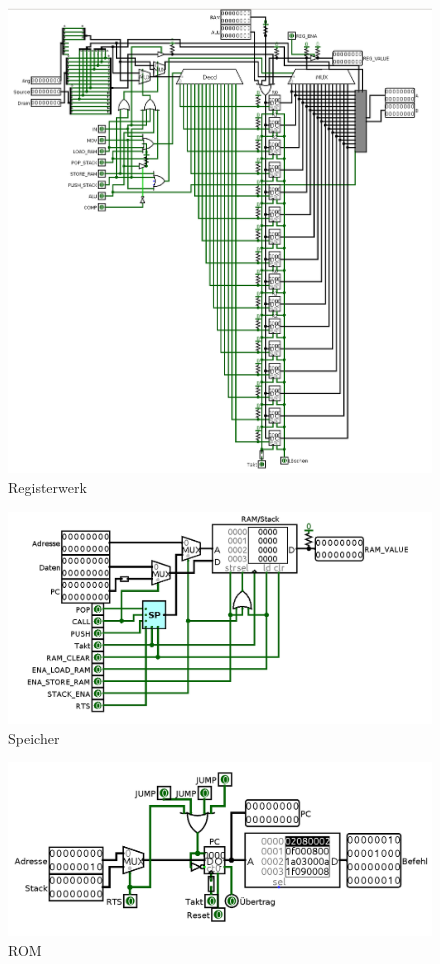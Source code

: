 \documentclass[a4paper,12pt]{article}
\begin{document}
\newpage

\begin{figure}[!htbp]
\includegraphics[scale=0.35]{register}
\centering
\caption{Registerwerk}
\label{fig:register}
\end{figure}

\newpage

\begin{figure}[!hp]
\includegraphics[scale=0.45]{ram}
\centering
\caption{Speicher}
\label{fig:speicher}
\end{figure}

\begin{figure}[!hp]
\includegraphics[scale=0.25]{rom}
\centering
\caption{ROM}
\label{fig:rom}
\end{figure}
\newpage
\end{document}
